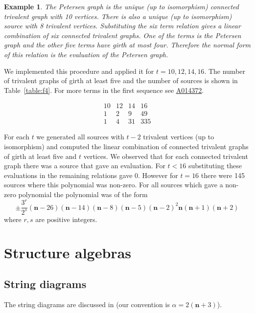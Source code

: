 \documentclass[12pt]{amsart}
\newtheorem{ex}[thm]{Example}
\newcommand{\oeis}[1]{\href{https://oeis.org/#1}{#1}}
\newcommand\nn{\mathbf{n}}
\begin{document}
\begin{ex}
The Petersen graph is the unique (up to isomorphism) connected trivalent graph with 10 vertices.
There is also a unique (up to isomorphism) source with 8 trivalent vertices. Substituting the 
six term relation gives a linear combination of six connected trivalent graphs. One of the terms is
the Petersen graph and the other five terms have girth at most four. Therefore the normal form of this
relation is the evaluation of the Petersen graph.
\end{ex}

We implemented this procedure and applied it for $t=10,12,14,16$.
The number of trivalent graphs of girth at least five and the number of sources is shown in Table~\ref{table:f4}. For more terms in the first sequence see \oeis{A014372}.

\begin{table}[h]
\begin{equation*}
\begin{array}{rrrr}
10 & 12 & 14 & 16 \\ \hline
1 & 2 & 9 & 49 \\
1 & 4 & 31 & 335
\end{array}
\end{equation*}
\caption{Trivalent graphs and sources}\label{table:f4}
\end{table}

For each $t$ we generated all sources
with $t-2$ trivalent vertices (up to isomorphism) and computed the linear combination of
connected trivalent graphs of girth at least five and $t$ vertices. We observed that for each 
connected trivalent graph there was a source that gave an evaluation. For $t<16$ substituting these
evaluations in the remaining relations gave 0. However for $t=16$ there were 145 sources where this polynomial
was non-zero. For all sources which gave a non-zero polynomial the polynomial was of the form
\[ \pm \frac{3^r}{2^s} (\nn - 26) (\nn - 14) (\nn - 8) (\nn - 5)(\nn - 2)^2 \nn (\nn + 1) (\nn + 2) \]
where $r,s$ are positive integers.

\section{Structure algebras}
\subsection{String diagrams}
The string diagrams are discussed in \cite[Chapter~18]{Cvitanovic2008}
(our convention is $\alpha=2(\nn+3)$).
\end{document}
